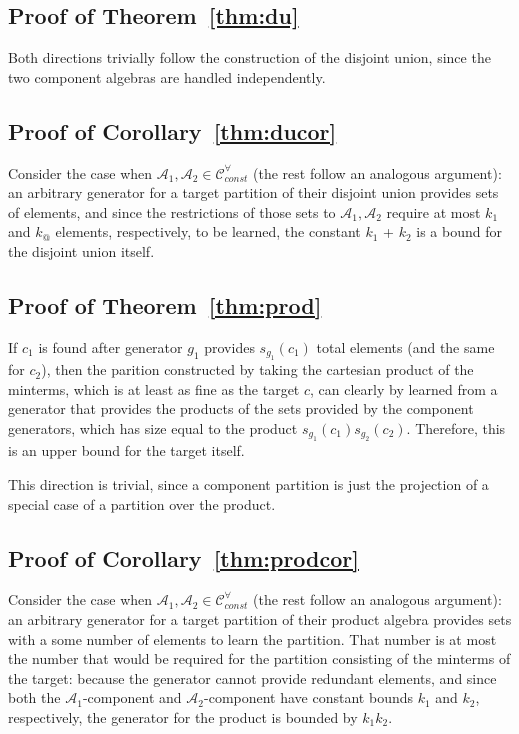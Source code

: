 \subsection*{Proof of Theorem~\ref{thm:du}}
Both directions trivially follow the construction of the disjoint union,
since the two component algebras are handled independently.

\subsection*{Proof of Corollary~\ref{thm:ducor}}
Consider the case when $\mathcal{A}_1,\mathcal{A}_2 \in \mathcal{C}_\textit{const}^\forall$
(the rest follow an analogous argument):
an arbitrary generator for a target partition of their disjoint union
provides sets of elements, and since the restrictions of those sets
to $\mathcal{A}_1,\mathcal{A}_2$ require at most $k_1$ and $k_@$
elements, respectively, to be learned,
the constant $k_1$ + $k_2$ is a bound for the disjoint union itself.

\subsection*{Proof of Theorem~\ref{thm:prod}}
\rone If $c_1$ is found after generator $g_1$
provides $s_{g_1}(c_1)$ total elements
(and the same for $c_2$), then the parition
constructed by taking the cartesian product of the minterms,
which is at least as fine as the target $c$,
can clearly by learned from a generator that
provides the products
of the sets provided by the component generators, which
has size equal to the product $s_{g_1}(c_1) s_{g_2}(c_2)$.
Therefore, this is an upper bound for the
target itself.

\rtwo This direction is trivial, since a component partition
is just the projection of a special case of
a partition over the product.

\subsection*{Proof of Corollary~\ref{thm:prodcor}}
Consider the case when $\mathcal{A}_1,\mathcal{A}_2 \in \mathcal{C}_\textit{const}^\forall$
(the rest follow an analogous argument):
an arbitrary generator for a target partition of their product algebra
provides sets with a some number of elements to learn the partition.
That number is at most the number that would be required for the
partition consisting of the minterms of the target:
because the generator cannot provide redundant elements,
and since both the $\mathcal{A}_1$-component
and $\mathcal{A}_2$-component have constant bounds
$k_1$ and $k_2$, respectively,
the generator for the product is bounded by $k_1 k_2$.

